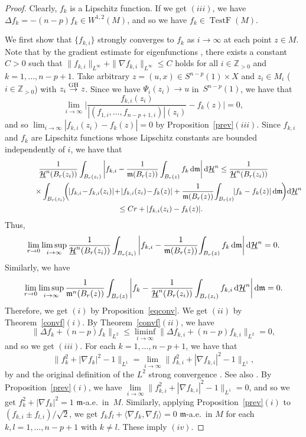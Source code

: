 \documentclass[pdftex]{sigma}
\numberwithin{equation}{section}
\theoremstyle{definition}
\newcommand{\TestF}{\operatorname{TestF}}
\newcommand{\Z}{\mathbb{Z}}
\newcommand{\mf}{\mathfrak{m}}
\newcommand{\nHa}{\underline{\mathcal{H}}}
\begin{document}
\begin{proof}
Clearly, $f_k$ is a Lipschitz function.
If we get $(iii)$, we have $\Delta f_k=-(n-p)f_k\in W^{1,2}(M)$, and so we have $f_k\in \TestF(M)$.

We first show that $\{f_{k,i}\}$ strongly converges to $f_k$ as $i\to \infty$ at each point $z\in M$.
Note that by the gradient estimate for eigenfunctions \cite[Theorem~7.3]{Pe3}, there exists a constant $C>0$ such that
$\|f_{k,i}\|_{L^\infty}+\|\nabla f_{k,i}\|_{L^\infty}\leq C$ holds for all $i\in \Z_{>0}$ and $k=1,\ldots, n-p+1$.
Take arbitrary $z=(u,x)\in S^{n-p}(1)\times X$ and $z_i\in M_i$ ($i\in \Z_{>0}$) with $z_i \stackrel{{\rm GH}}{\to} z$.
Since we have $\Psi_i(z_i)\to u$ in~$S^{n-p}(1)$, we have that
\[
\lim_{i\to \infty}\bigg|
\frac{f_{k,i}(z_i)}{|(f_{1,i},\ldots, f_{n-p+1,i})|(z_i)}-f_k(z)
\bigg|=0,
\]
and so $\lim_{i\to \infty}|f_{k,i}(z_i)-f_k(z)|=0$ by Proposition~\ref{prev}$(iii)$.
Since $f_{k,i}$ and $f_k$ are Lipschitz functions whose Lipschitz constants are bounded independently of $i$, we have that
\begin{gather*}
\frac{1}{\nHa^n(B_r (z_i))}\int_{B_r(z_i)}\bigg|f_{k,i}-\frac{1}{\mf(B_r(z))}\int_{B_r(z)}f_k\,{\rm d}\mf\bigg|\,{\rm d}\nHa^n\leq\frac{1}{\nHa^n(B_r (z_i))}
\\ \qquad\qquad
\times\int_{B_r(z_i)}\!\!\bigg(\!|f_{k,i}\!-\!f_{k,i}(z_i)|\!+\!|f_{k,i}(z_i)\!-\!f_k(z)|
+\frac{1}{\mf(B_r(z))}\!\int_{B_r(z)}\!\!|f_k-f_k(z)|\,{\rm d}\mf\!\bigg){\rm d}\nHa^n
\\ \qquad
\leq C r + |f_{k,i}(z_i)-f_k(z)|.
\end{gather*}
Thus,
\begin{gather*}
\lim_{r\to 0}\limsup_{i\to \infty}\frac{1}{\nHa^n(B_r (z_i))}\int_{B_r(z_i)}\bigg|f_{k,i}-\frac{1}{\mf(B_r(z))}\!\int_{B_r(z)}f_k\,{\rm d}\mf\bigg|\,{\rm d}\nHa^n=0.
\end{gather*}
Similarly, we have
\[
\lim_{r\to 0}\limsup_{i\to \infty}\frac{1}{\mf^n(B_r (z))}\int_{B_r(z)}\bigg|f_{k}-\frac{1}{\nHa^n(B_r(z_i))}\int_{B_r(z_i)}f_{k,i}\,{\rm d}\nHa^n\bigg|\,{\rm d}\mf=0.
\]
Therefore, we get $(i)$ by Proposition~\ref{eqconv}.
We get $(ii)$ by Theorem~\ref{convf}$(i)$.
By Theorem~\ref{convf}$(ii)$, we have
\[
\|\Delta f_k+(n-p)f_k\|_{L^2}\leq\liminf_{i\to \infty}\|\Delta f_{k,i}+(n-p)f_{k,i}\|_{L^2}=0,
\]
and so we get $(iii)$.
For each $k=1,\ldots,n-p+1$, we have that
\[
\|f_k^2 +|\nabla f_k|^2-1\|_{L^1}=\lim_{i\to \infty} \|f_{k,i}^2 +|\nabla f_{k,i}|^2-1\|_{L^1},
\]
by \cite[Propositions~3.11 and~3.45]{Ho1} and the original definition of the $L^2$ strong convergence \cite[Definitions~3.25 and~3.58]{Ho1}.
See also \cite[Proposition~3.3 and~Theorem~5.7]{AH}.
By Proposition~\ref{prev}$(i)$, we have $\lim\limits_{i\to \infty} \|f_{k,i}^2 +|\nabla f_{k,i}|^2-1\|_{L^1}=0$, and so we get $f_k^2+|\nabla f_k|^2=1$ $\mf$-a.e.\ in~$M$.
Similarly, applying Proposition~\ref{prev}$(i)$ to $(f_{k,i}\pm f_{l,i})/{\sqrt{2}}$, we get $f_k f_l +\langle\nabla f_k,\nabla f_l\rangle=0$ $\mf$-a.e.\ in $M$ for each $k,l=1,\ldots,n-p+1$ with $k\neq l$.
These imply $(iv)$.
\end{proof}
\end{document}
